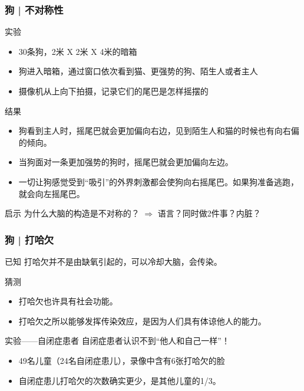 \begin{frame}
  \frametitle{狗 | 不对称性}
  \begin{block}{实验}
    \begin{itemize}
      \item 30条狗，2米 X 2米 X 4米的暗箱
      \item 狗进入暗箱，通过窗口依次看到猫、更强势的狗、陌生人或者主人
      \item 摄像机从上向下拍摄，记录它们的尾巴是怎样摇摆的
    \end{itemize}
  \end{block}
  \vspace{-0.5em}
  \pause
  \begin{block}{结果}
    \begin{itemize}
      \item 狗看到主人时，摇尾巴就会更加偏向右边，见到陌生人和猫的时候也有向右偏的倾向。
      \item 当狗面对一条更加强势的狗时，摇尾巴就会更加偏向左边。
      \item 一切让狗感觉受到“吸引”的外界刺激都会使狗向右摇尾巴。如果狗准备逃跑，就会向左摇尾巴。
    \end{itemize}
  \end{block}
  \vspace{-0.5em}
  \pause
  \begin{block}{启示}
    为什么大脑的构造是不对称的？ $\Longrightarrow$ 语言？同时做2件事？内脏？
  \end{block}
\end{frame}

\begin{frame}
  \frametitle{狗 | 打哈欠}
  \begin{block}{已知}
    打哈欠并不是由缺氧引起的，可以冷却大脑，会传染。
  \end{block}
  \pause
  \begin{block}{猜测}
    \begin{itemize}
      \item 打哈欠也许具有社会功能。
      \item 打哈欠之所以能够发挥传染效应，是因为人们具有体谅他人的能力。
    \end{itemize}
  \end{block}
  \pause
  \begin{block}{实验——自闭症患者}
    自闭症患者认识不到“他人和自己一样”！
    \begin{itemize}
      \item 49名儿童（24名自闭症患儿），录像中含有6张打哈欠的脸
      \item 自闭症患儿打哈欠的次数确实更少，是其他儿童的1/3。
    \end{itemize}
  \end{block}
\end{frame}

